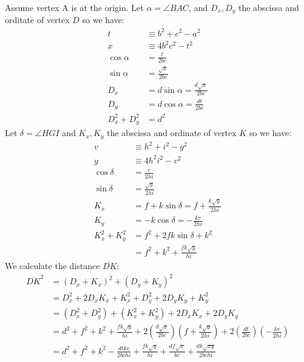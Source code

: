\documentclass[11pt]{article}
\begin{document}
Assume vertex A is at the origin.
Let $\alpha = \angle{BAC}$, and $D_x,D_y$ the abscissa and orditate of vertex $D$ so we have:
\begin{align}
t &\equiv b^2 + c^2 - a^2\\
x &\equiv 4b^2c^2 - t^2\\
\cos\alpha &= \frac{t}{2bc}\\
\sin\alpha &= \frac{\sqrt{x}}{2bc}\\
D_x &= d\sin\alpha = \frac{d\sqrt{x}}{2bc}\\
D_y &= d\cos\alpha = \frac{dt}{2bc}\\
D_x^2 + D_y^2 &= d^2
\end{align}
Let $\delta = \angle{HGI}$ and $K_x,K_y$ the abscissa and ordinate of
vertex $K$ so we have:
\begin{align}
v &\equiv h^2 + i^2 - g^2\\
y &\equiv 4h^2i^2 - v^2\\
\cos\delta &= \frac{v}{2hi}\\
\sin\delta &= \frac{\sqrt{y}}{2hi}\\
K_x &= f + k\sin\delta = f + \frac{k\sqrt{y}}{2hi}\\
K_y &= -k\cos\delta = -\frac{kv}{2hi}\\
K_x^2 + K_y^2 &= f^2 + 2fk\sin\delta + k^2\\
 &= f^2+k^2 + \frac{fk\sqrt{y}}{hi}
\end{align}
We calculate the distance $\overline{DK}$:
\begin{align}
\overline{DK}^2 &= (D_x+K_x)^2 + (D_y+K_y)^2 \nonumber\\
 &= D_x^2 + 2D_xK_x + K_x^2 + D_y^2 + 2D_yK_y + K_y^2 \nonumber\\
 &= (D_x^2+D_y^2) + (K_x^2+K_y^2) + 2D_xK_x + 2D_yK_y \nonumber\\
 &= d^2 + f^2 + k^2 + \frac{fk\sqrt{y}}{hi}
  + 2\left(\frac{d\sqrt{x}}{2bc}\right)\left(f + \frac{k\sqrt{y}}{2hi}\right)
  + 2\left(\frac{dt}{2bc}\right)\left(-\frac{kv}{2hi}\right) \nonumber\\
 &= d^2 + f^2 + k^2 - \frac{dtkv}{2bchi} + \frac{fk\sqrt{y}}{hi}
  + \frac{df\sqrt{x}}{bc} + \frac{dk\sqrt{xy}}{2bchi}
\end{align}
\end{document}
